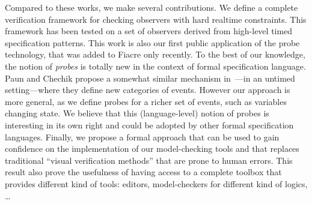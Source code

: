 \documentclass[a4paper]{scrartcl}
\begin{document}
Compared to these works, we make several contributions. We define a
complete verification framework for checking observers with hard
realtime constraints. This framework has been tested on a set of
observers derived from high-level timed specification patterns. This
work is also our first public application of the probe technology,
that was added to Fiacre only recently. To the best of our knowledge,
the notion of \emph{probes} is totally new in the context of formal
specification language. Paun and Chechik propose a somewhat similar
mechanism in~\cite{epp99,eeltp99}---in an untimed setting---where they
define new categories of events. However our approach is more general,
as we define probes for a richer set of events, such as variables
changing state. We believe that this (language-level) notion of probes
is interesting in its own right and could be adopted by other formal
specification languages. Finally, we propose a formal approach that
can be used to gain confidence on the implementation of our
model-checking tools and that replaces traditional ``visual
verification methods'' that are prone to human errors. This result
also prove the usefulness of having access to a complete toolbox that
provides different kind of tools: editors, model-checkers for
different kind of logics, \dots
\end{document}
